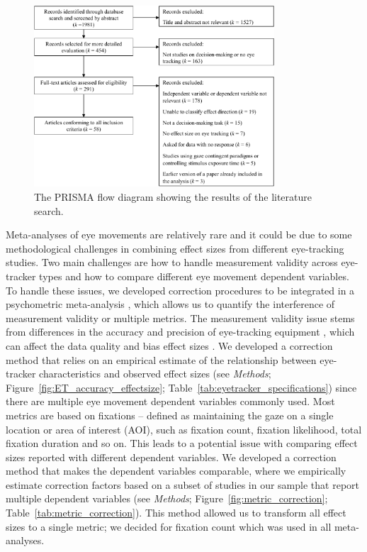\documentclass[english,natbib,man,floatsintext]{apa6}
\begin{document}
\begin{figure}[H]
\includegraphics[width=0.8\textwidth]{prisma}
\centering
\caption{The PRISMA flow diagram showing the results of the literature search.}
\label{fig:flow_diagram}
\end{figure}


Meta-analyses of eye movements are relatively rare and it could be due to some methodological challenges in combining effect sizes from different eye-tracking studies. Two main challenges are how to handle measurement validity across eye-tracker types and how to compare different eye movement dependent variables. To handle these issues, we developed correction procedures to be integrated in a psychometric meta-analysis \citep{hunter2004a}, which allows us to quantify the interference of measurement validity or multiple metrics. The measurement validity issue stems from differences in the accuracy and precision of eye-tracking equipment \citep{holmqvist2015a}, which can affect the data quality and bias effect sizes \citep{orquin2016a}. We developed a correction method that relies on an empirical estimate of the relationship between eye-tracker characteristics and observed effect sizes (see \textit{Methods}; Figure~\ref{fig:ET_accuracy_effectsize}; Table~\ref{tab:eyetracker_specifications}) since there are multiple eye movement dependent variables commonly used. Most metrics are based on fixations -- defined as maintaining the gaze on a single location or area of interest (AOI), such as fixation count, fixation likelihood, total fixation duration and so on. This leads to a potential issue with comparing effect sizes reported with different dependent variables. We developed a correction method that makes the dependent variables comparable, where we empirically estimate correction factors based on a subset of studies in our sample that report multiple dependent variables (see \textit{Methods}; Figure~\ref{fig:metric_correction}; Table~\ref{tab:metric_correction}). This method allowed us to transform all effect sizes to a single metric; we decided for fixation count which was used in all meta-analyses. 
\end{document}
